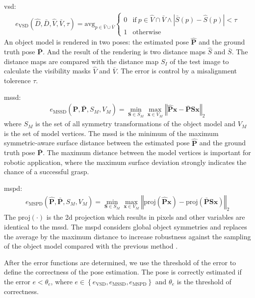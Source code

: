 \documentclass[12pt,DIV14,BCOR12mm,a4paper,footinclude=false,headinclude,parskip=half-,twoside,openright,cleardoublepage=empty,toc=index,bibliography=totoc,listof=totoc]{scrreprt}
\numberwithin{equation}{chapter}
\begin{document}
\gls{vsd}: 
\begin{align}
 e_{\text{VSD}}\left(\hat{D},\bar{D},\hat{V},\bar{V},\tau\right)=\text{avg}_{p\in \hat{V}\cup \bar{V}}
  \begin{cases}
    0 & \text{if} \ p\in \hat{V}\cap  \bar{V} \land \left|\bar{S}(p)-\hat{S}(p)\right|<\tau\\
    1 & \text{otherwise}
  \end{cases}
\end{align}
An object model is rendered in two poses: the estimated pose $\mathbf{\hat{P}}$ and the ground truth pose $\mathbf{\bar{P}}$. And the result of the rendering is two distance maps $\hat{S}$ and $\bar{S}$. The distance maps are compared with the distance map $S_I$ of the test image to calculate the visibility masks $\hat{V}$ and $\bar{V}$. The error is control by a misalignment tolerence $\tau$.

\gls{mssd}:
\begin{align}
  e_{\text{MSSD}}\left(\mathbf{\hat{P}},\mathbf{\bar{P}},S_{M},V_{M}\right)=\min_{\mathbf{S}\in S_{M}}\max_{\mathbf{x}\in V_{M}}\left\Vert \hat{\mathbf{P}}\mathbf{x}-\bar{\mathbf{P}}\mathbf{Sx}\right\Vert _{2} 
 \end{align}
where $S_{M}$ is the set of all symmetry transformations of the object model and $V_{M}$ is the set of model vertices. The \gls{mssd} is the minimum of the maximum symmetric-aware surface distance between the estimated pose $\mathbf{\hat{P}}$ and the ground truth pose $\mathbf{\bar{P}}$. The maximum distance between the model vertices is important for robotic application, where the maximum surface deviation strongly indicates the chance of a successful grasp.

\gls{mspd}:
\begin{align}
  e_{\text{MSPD}}\left(\mathbf{\hat{P}},\mathbf{\bar{P}},S_{M},V_{M}\right)=\min_{\mathbf{S}\in S_{M}}\max_{\mathbf{x}\in V_{M}}\left\Vert \text{proj}\left(\hat{\mathbf{P}}\mathbf{x}\right)-\text{proj}\left(\bar{\mathbf{P}}\mathbf{Sx}\right)\right\Vert _{2} 
 \end{align}
The proj$(\cdot)$ is the \gls{2d} projection which results in pixels and other variables are identical to the \gls{mssd}. The \gls{mspd} considers global object symmetries and replaces the average by the maximum distance to increase robustness against the sampling of the object model compared with the previous method \cite{7780735}.

After the error functions are determined, we use the threshold of the error to define the correctness of the pose estimation. The pose is correctly estimated if the error $e<\theta_{e}$, where $e\in \left\{e_{\text{VSD}},e_{\text{MSSD}},e_{\text{MSPD}}\right\}$ and $\theta_{e}$ is the threshold of correctness.
\end{document}
